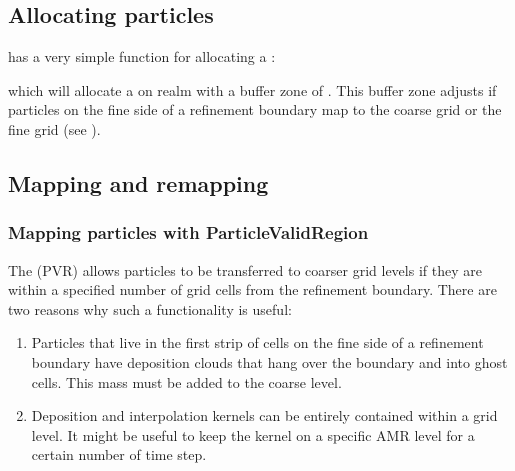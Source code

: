 \documentclass[letterpaper,10pt,english]{sphinxmanual}
\begin{document}
\subsection{Allocating particles}
\label{\detokenize{Source/Particles:allocating-particles}}
 has a very simple function for allocating a :

\begin{sphinxVerbatim}[commandchars=\\\{\},formatcom=\scriptsize]
  
        
\end{sphinxVerbatim}

which will allocate a  on realm  with a buffer zone of .
This buffer zone adjusts if particles on the fine side of a refinement boundary map to the coarse grid or the fine grid (see {\hyperref[\detokenize{Source/Particles:chap-particlemapping}]{}}).


\subsection{Mapping and remapping}
\label{\detokenize{Source/Particles:mapping-and-remapping}}\label{\detokenize{Source/Particles:chap-particlemapping}}

\subsubsection{Mapping particles with ParticleValidRegion}
\label{\detokenize{Source/Particles:mapping-particles-with-particlevalidregion}}
The  (PVR) allows particles to be transferred to coarser grid levels if they are within a specified number of grid cells from the refinement boundary.
There are two reasons why such a functionality is useful:
\begin{enumerate}
%
\item {} 
Particles that live in the first strip of cells on the fine side of a refinement boundary have deposition clouds that hang over the boundary and into ghost cells.
This mass must be added to the coarse level.

\item {} 
Deposition and interpolation kernels can be entirely contained within a grid level.
It might be useful to keep the kernel on a specific AMR level for a certain number of time step.

\end{enumerate}
\end{document}
